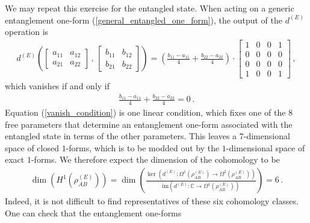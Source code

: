 \documentclass[12pt]{article}
\numberwithin{equation}{section}
\begin{document}
We may repeat this exercise for the entangled state. When acting on a generic entanglement one-form (\ref{general_entangled_one_form}), the output of the $d^{(E)}$ operation is
%
\begin{align}
    d^{(E)} \left( \begin{bmatrix} a_{11} & a_{12} \\ a_{21} & a_{22} \end{bmatrix} \, , \, \begin{bmatrix} b_{11} & b_{12} \\ b_{21} & b_{22} \end{bmatrix} \right) = \left( \frac{b_{11} - a_{11}}{4} + \frac{b_{22} - a_{22}}{4} \right) \cdot \begin{bmatrix} 1 & 0 & 0 & 1 \\ 0 & 0 & 0 & 0 \\ 0 & 0 & 0 & 0 \\ 1 & 0 & 0 & 1 \end{bmatrix} \, ,
\end{align}
%
which vanishes if and only if
%
\begin{align}\label{vanish_condition}
    \frac{b_{11} - a_{11}}{4} + \frac{b_{22} - a_{22}}{4} = 0 \, .
\end{align}
%
Equation (\ref{vanish_condition}) is one linear condition, which fixes one of the $8$ free parameters that determine an entanglement one-form associated with the entangled state in terms of the other parameters. This leaves a $7$-dimensional space of closed $1$-forms, which is to be modded out by the $1$-dimensional space of exact $1$-forms. We therefore expect the dimension of the cohomology to be
%
\begin{align}
    \dim \left( H^1 \left( \rho_{AB}^{(E)} \right) \right) = \dim \left( \frac{\ker \left( d^{(E)} : \Omega^1 \left( \rho_{AB}^{(E)} \right) \to \Omega^2 \left( \rho_{AB}^{(E)} \right) \right)}{\mathrm{im} \left( d^{(E)} : \mathbb{C} \to \Omega^1 \left( \rho_{AB}^{(E)} \right) \right) } \right) = 6 \, .
\end{align}
%
Indeed, it is not difficult to find representatives of these six cohomology classes. One can check that the entanglement one-forms
%
\end{document}
